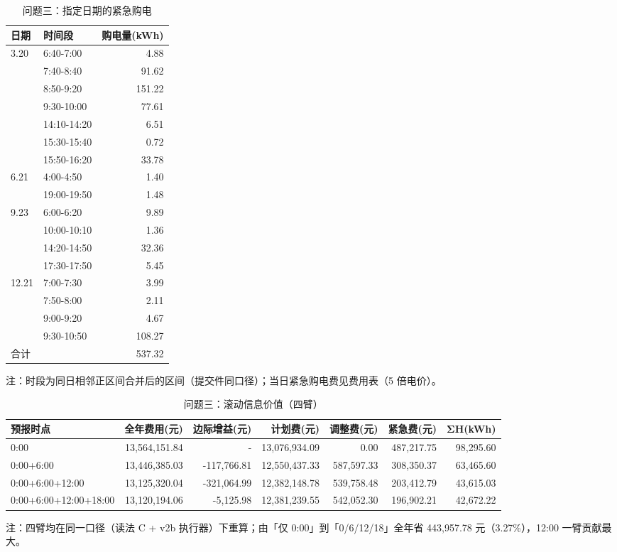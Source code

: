\begin{table}[htbp]
\centering
\caption{问题三：指定日期的紧急购电}
\label{tab:q3-c}
\small
\setlength{\tabcolsep}{4pt}
\begin{tabular}{llr}
\toprule
日期 & 时间段 & 购电量(kWh) \\
\midrule
3.20 & 6:40-7:00 & 4.88 \\
 & 7:40-8:40 & 91.62 \\
 & 8:50-9:20 & 151.22 \\
 & 9:30-10:00 & 77.61 \\
 & 14:10-14:20 & 6.51 \\
 & 15:30-15:40 & 0.72 \\
 & 15:50-16:20 & 33.78 \\
6.21 & 4:00-4:50 & 1.40 \\
 & 19:00-19:50 & 1.48 \\
9.23 & 6:00-6:20 & 9.89 \\
 & 10:00-10:10 & 1.36 \\
 & 14:20-14:50 & 32.36 \\
 & 17:30-17:50 & 5.45 \\
12.21 & 7:00-7:30 & 3.99 \\
 & 7:50-8:00 & 2.11 \\
 & 9:00-9:20 & 4.67 \\
 & 9:30-10:50 & 108.27 \\
合计 &  & 537.32 \\
\bottomrule
\end{tabular}
\vspace{2pt}
\begin{flushleft}\footnotesize 注：时段为同日相邻正区间合并后的区间（提交件同口径）；当日紧急购电费见费用表（5 倍电价）。\end{flushleft}
\end{table}
\begin{table}[htbp]
\centering
\caption{问题三：滚动信息价值（四臂）}
\label{tab:q3-voi}
\small
\setlength{\tabcolsep}{4pt}
\begin{tabular}{lrrrrrr}
\toprule
预报时点 & 全年费用(元) & 边际增益(元) & 计划费(元) & 调整费(元) & 紧急费(元) & ΣH(kWh) \\
\midrule
0:00 & 13,564,151.84 & - & 13,076,934.09 & 0.00 & 487,217.75 & 98,295.60 \\
0:00+6:00 & 13,446,385.03 & -117,766.81 & 12,550,437.33 & 587,597.33 & 308,350.37 & 63,465.60 \\
0:00+6:00+12:00 & 13,125,320.04 & -321,064.99 & 12,382,148.78 & 539,758.48 & 203,412.79 & 43,615.03 \\
0:00+6:00+12:00+18:00 & 13,120,194.06 & -5,125.98 & 12,381,239.55 & 542,052.30 & 196,902.21 & 42,672.22 \\
\bottomrule
\end{tabular}
\vspace{2pt}
\begin{flushleft}\footnotesize 注：四臂均在同一口径（读法 C + v2b 执行器）下重算；由「仅 0:00」到「0/6/12/18」全年省 443,957.78 元（3.27\%），12:00 一臂贡献最大。\end{flushleft}
\end{table}
